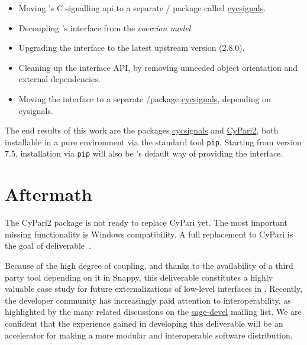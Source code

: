 \documentclass{deliverablereport}
\begin{document}
\begin{itemize}
\tightlist
\item Moving \Sage's C signalling api to a separate \Python/\Cython
  package called
  \href{https://github.com/sagemath/cysignals}{cycsignals}.
\item Decoupling \Sage's \Pari interface from the \emph{coercion
    model}.
\item Upgrading the \Pari interface to the latest upstream version
  (2.8.0).
\item Cleaning up the \Pari interface API, by removing unneeded object
  orientation and external dependencies.
\item Moving the \Pari interface to a separate \Python/\Cython package
  \href{https://github.com/sagemath/cysignals}{cycsignals}, depending
  on cysignals.
\end{itemize}

The end results of this work are the packages
\href{https://github.com/sagemath/cysignals}{cycsignals} and
\href{https://github.com/sagemath/cypari2}{CyPari2}, both installable
in a pure \Python environment via the standard tool
\texttt{pip}. Starting from version 7.5, installation via \texttt{pip}
will also be \Sage's default way of providing the \Pari interface.


\section{Aftermath}

The CyPari2 package is not ready to replace CyPari yet. The most
important missing functionality is Windows compatibility. A full
replacement to CyPari is the goal of
deliverable~.

Because of the high degree of coupling, and thanks to the availability
of a third party tool depending on it in Snappy, this deliverable
constitutes a highly valuable case study for future externalizations
of low-level interfaces in \Sage. Recently, the \Sage developer
community has increasingly paid attention to interoperability, as
highlighted by the many related discussions on the
\href{https://groups.google.com/forum/#!forum/sage-devel}{sage-devel}
mailing list.  We are confident that the experience gained in
developing this deliverable will be an accelerator for making \Sage a
more modular and interoperable software distribution.
\end{document}
